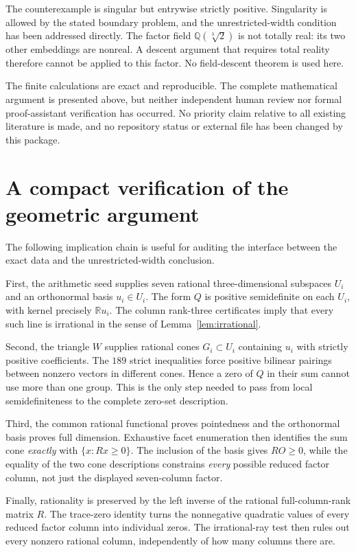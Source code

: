 \documentclass[11pt]{article}
\theoremstyle{definition}
\newcommand{\R}{\mathbb R}
\newcommand{\Q}{\mathbb Q}
\numberwithin{equation}{section}
\begin{document}
The counterexample is singular but entrywise strictly positive. Singularity
is allowed by the stated boundary problem, and the unrestricted-width
condition has been addressed directly. The factor field
$\Q(\sqrt[3]{2})$ is not totally real: its two other embeddings are
nonreal. A descent argument that requires total reality therefore cannot
be applied to this factor. No field-descent theorem is used here.

The finite calculations are exact and reproducible. The complete
mathematical argument is presented above, but neither independent human
review nor formal proof-assistant verification has occurred. No priority
claim relative to all existing literature is made, and no repository
status or external file has been changed by this package.

\appendix
\section{A compact verification of the geometric argument}
The following implication chain is useful for auditing the interface
between the exact data and the unrestricted-width conclusion.

First, the arithmetic seed supplies seven rational three-dimensional
subspaces $U_i$ and an orthonormal basis $u_i\in U_i$. The form $Q$ is
positive semidefinite on each $U_i$, with kernel precisely $\R u_i$.
The column rank-three certificates imply that every such line is
irrational in the sense of Lemma~\ref{lem:irrational}.

Second, the triangle $W$ supplies rational cones $G_i\subset U_i$ containing
$u_i$ with strictly positive coefficients. The $189$ strict inequalities
force positive bilinear pairings between nonzero vectors in different
cones. Hence a zero of $Q$ in their sum cannot use more than one group.
This is the only step needed to pass from local semidefiniteness to the
complete zero-set description.

Third, the common rational functional proves pointedness and the
orthonormal basis proves full dimension. Exhaustive facet enumeration
then identifies the sum cone \emph{exactly} with $\{x:Rx\geq0\}$.
The inclusion of the basis gives $RO\geq0$, while the equality of the two
cone descriptions constrains \emph{every} possible reduced factor column,
not just the displayed seven-column factor.

Finally, rationality is preserved by the left inverse of the rational
full-column-rank matrix $R$. The trace-zero identity turns the nonnegative
quadratic values of every reduced factor column into individual zeros.
The irrational-ray test then rules out every nonzero rational column,
independently of how many columns there are.
\end{document}

